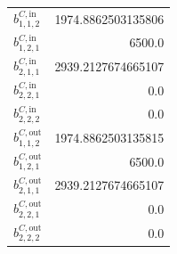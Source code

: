 \documentclass{article}%
\begin{document}
\begin{multicols*}{3}
\begin{supertabular}{lr}
	$b_{1,1,2}^{C,\text{in}}$ & 1974.8862503135806 \\%
	$b_{1,2,1}^{C,\text{in}}$ & 6500.0 \\%
	$b_{2,1,1}^{C,\text{in}}$ & 2939.2127674665107 \\%
	$b_{2,2,1}^{C,\text{in}}$ & 0.0 \\%
	$b_{2,2,2}^{C,\text{in}}$ & 0.0 \\%
	$b_{1,1,2}^{C,\text{out}}$ & 1974.8862503135815 \\%
	$b_{1,2,1}^{C,\text{out}}$ & 6500.0 \\%
	$b_{2,1,1}^{C,\text{out}}$ & 2939.2127674665107 \\%
	$b_{2,2,1}^{C,\text{out}}$ & 0.0 \\%
	$b_{2,2,2}^{C,\text{out}}$ & 0.0 \\%
\end{supertabular}%
\end{multicols*}%
\end{document}
